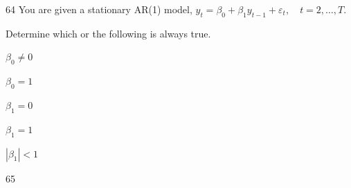 \begin{question}{64}
You are given a stationary AR(1) model, $y_t = \beta_0 + \beta_1 y_{t-1} + \varepsilon_t, \quad t = 2, \ldots, T.$

Determine which or the following is always true.

\begin{choices}
\item $\beta_0 \neq 0$
\item $\beta_0 = 1$
\item $\beta_1 = 0$
\item $\beta_1 = 1$
\item $|\beta_1| < 1$
\end{choices}
\end{question}

\begin{question}{65}
\deleted
\end{question}

